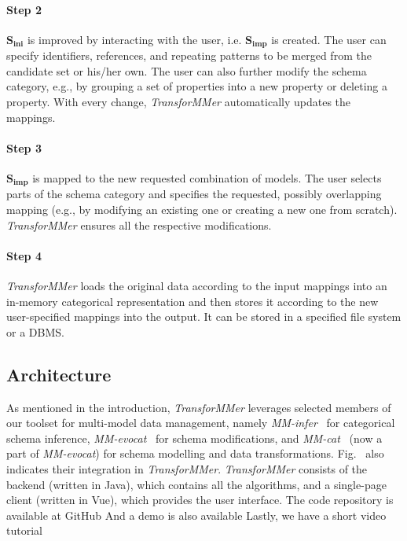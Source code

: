 \paragraph{Step 2}
$\mathbf{S_{ini}}$ is improved by interacting with the user, i.e. $\mathbf{S_{imp}}$ is created. The user can specify identifiers, references, and repeating patterns to be merged from the candidate set or his/her own.
The user can also further modify the schema category, e.g., by grouping a set of properties into a new property or deleting a property. With every change, \textit{TransforMMer} automatically updates the mappings. 


\paragraph{Step 3}
$\mathbf{S_{imp}}$ is mapped to the new requested combination of models. The user selects parts of the schema category and specifies the requested, possibly overlapping mapping (e.g., by modifying an existing one or creating a new one from scratch). \textit{TransforMMer} ensures all the respective modifications.


\paragraph{Step 4}
\textit{TransforMMer} loads the original data according to the input mappings into an in-memory categorical representation and then stores it according to the new user-specified mappings into the output. It can be stored in a specified file system or a DBMS.


\subsection{Architecture}
As mentioned in the introduction, \textit{TransforMMer} leverages selected members of our toolset for multi-model data management, namely \textit{MM-infer}~\citep{mm_infer} for categorical schema inference, \textit{MM-evocat}~\citep{cikm_2022} for schema modifications, and \textit{MM-cat}~\citep{mm_cat} (now a part of \textit{MM-evocat}) for schema modelling and data transformations. Fig.~ also indicates their integration in \textit{TransforMMer}. \textit{TransforMMer} consists of the backend (written in Java), which contains all the algorithms, and a single-page client (written in Vue), which provides the user interface. The code repository is available at GitHub And a demo is also available Lastly, we have a short video tutorial

